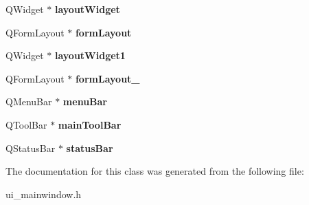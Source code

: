 \begin{DoxyCompactItemize}
Q\+Widget $\ast$ {\bfseries layout\+Widget}
\item 
\mbox{\label{class_ui___main_window_afedcce3d8f3dddf4c1fd5b768660b8ee}} 
Q\+Form\+Layout $\ast$ {\bfseries form\+Layout}
\item 
\mbox{\label{class_ui___main_window_aab31b3dec8d767525dea6f163e029e48}} 
Q\+Widget $\ast$ {\bfseries layout\+Widget1}
\item 
\mbox{\label{class_ui___main_window_adb9e9053924d82773ec4e07e6c96271f}} 
Q\+Form\+Layout $\ast$ {\bfseries form\+Layout\+\_}
\item 
\mbox{\label{class_ui___main_window_a2be1c24ec9adfca18e1dcc951931457f}} 
Q\+Menu\+Bar $\ast$ {\bfseries menu\+Bar}
\item 
\mbox{\label{class_ui___main_window_a5172877001c8c7b4e0f6de50421867d1}} 
Q\+Tool\+Bar $\ast$ {\bfseries main\+Tool\+Bar}
\item 
\mbox{\label{class_ui___main_window_a50fa481337604bcc8bf68de18ab16ecd}} 
Q\+Status\+Bar $\ast$ {\bfseries status\+Bar}
\end{DoxyCompactItemize}


The documentation for this class was generated from the following file\+:\begin{DoxyCompactItemize}
\item 
ui\+\_\+mainwindow.\+h\end{DoxyCompactItemize}
